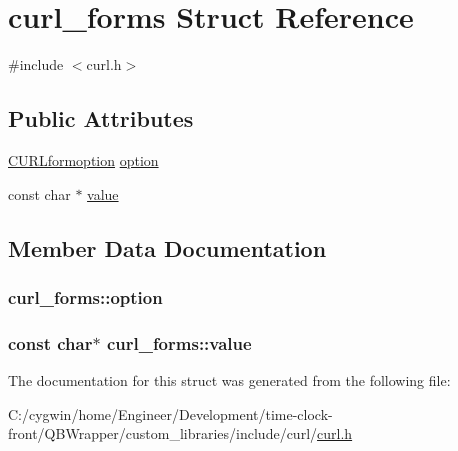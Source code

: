 \hypertarget{structcurl__forms}{}\section{curl\+\_\+forms Struct Reference}
\label{structcurl__forms}


{\ttfamily \#include $<$curl.\+h$>$}

\subsection*{Public Attributes}
\begin{DoxyCompactItemize}
\item 
\hyperlink{curl_8h_ae5d88dd64ce41daec95c47679b8c000f}{C\+U\+R\+Lformoption} \hyperlink{structcurl__forms_a10acf738004892eb1663e560af087aa7}{option}
\item 
const char $\ast$ \hyperlink{structcurl__forms_ac7d32e35e6d174ed54f28eab150f12e6}{value}
\end{DoxyCompactItemize}


\subsection{Member Data Documentation}
\hypertarget{structcurl__forms_a10acf738004892eb1663e560af087aa7}{}
\subsubsection[{option}]{ curl\+\_\+forms\+::option}\label{structcurl__forms_a10acf738004892eb1663e560af087aa7}
\hypertarget{structcurl__forms_ac7d32e35e6d174ed54f28eab150f12e6}{}
\subsubsection[{value}]{\setlength{\rightskip}{0pt plus 5cm}const char$\ast$ curl\+\_\+forms\+::value}\label{structcurl__forms_ac7d32e35e6d174ed54f28eab150f12e6}


The documentation for this struct was generated from the following file\+:\begin{DoxyCompactItemize}
\item 
C\+:/cygwin/home/\+Engineer/\+Development/time-\/clock-\/front/\+Q\+B\+Wrapper/custom\+\_\+libraries/include/curl/\hyperlink{curl_8h}{curl.\+h}\end{DoxyCompactItemize}
